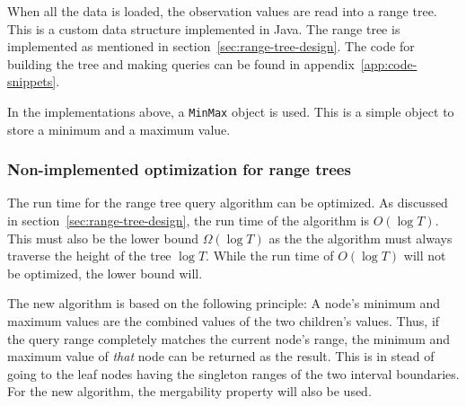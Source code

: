 When all the data is loaded, the observation values are read into a range tree.
This is a custom data structure implemented in Java. The range tree is
implemented as mentioned in section~\ref{sec:range-tree-design}. The code for
building the tree and making queries can be found in
appendix~\ref{app:code-snippets}. 

In the implementations above, a \texttt{MinMax} object is used. This is a simple
object to store a minimum and a maximum value. 

\subsubsection{Non-implemented optimization for range trees}

The run time for the range tree query algorithm can be optimized. As discussed
in section~\ref{sec:range-tree-design}, the run time of the algorithm is $O(\log
T)$. This must also be the lower bound $\Omega(\log T)$ as the the algorithm
must always traverse the height of the tree $\log T$. While the run time of
$O(\log T)$ will not be optimized, the lower bound will. 

The new algorithm is based on the following principle: A node's minimum and
maximum values are the combined values of the two children's values. Thus, if
the query range completely matches the current node's range, the minimum and
maximum value of \textit{that} node can be returned as the result. This is in
stead of going to the leaf nodes having the singleton ranges of the two interval
boundaries. For the new algorithm, the mergability property will also be used. 

